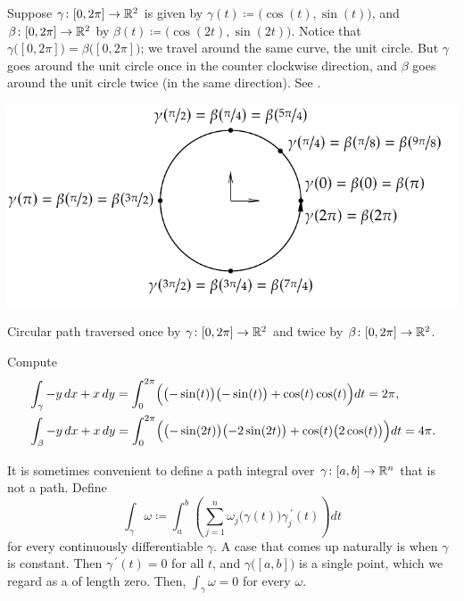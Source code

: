 \begin{example}
Suppose $\gamma \colon [0,2\pi] \to {\mathbb{R}}^2$ is given by $\gamma(t) \coloneqq
\bigl(\cos(t),\sin(t)\bigr)$, and
$\beta \colon [0,2\pi] \to {\mathbb{R}}^2$ by $\beta(t) \coloneqq
\bigl(\cos(2t),\sin(2t)\bigr)$.  Notice that
$\gamma\bigl([0,2\pi]\bigr) = \beta\bigl([0,2\pi]\bigr)$; we travel
around the same curve, the unit circle.  But $\gamma$ goes around the unit
circle once in the counter clockwise direction, and $\beta$ goes around the
unit circle twice (in the same direction). 
See .
\begin{myfigureht}
\includegraphics{figures/circlepathrepar2}
\caption{Circular path traversed once by
$\gamma \colon [0,2\pi] \to {\mathbb{R}}^2$
and twice by
$\beta \colon [0,2\pi] \to {\mathbb{R}}^2$.\label{fig:circlepathrepar2}}
\end{myfigureht}

Compute
\begin{align*}
& \int_{\gamma} -y\, dx + x\,dy
=
\int_0^{2\pi}
\Bigl( \bigl(-\sin(t) \bigr) \bigl(-\sin(t) \bigr) + \cos(t) \cos(t) \Bigr) dt
=
2 \pi,\\
& \int_{\beta} -y\, dx + x\,dy
=
\int_0^{2\pi}
\Bigl( \bigl(-\sin(2t) \bigr) \bigl(-2\sin(2t) \bigr) + \cos(t)
\bigl(2\cos(t)\bigr) \Bigr) dt
=
4 \pi.
\end{align*}
\end{example}

It is sometimes convenient to define a path integral over $\gamma \colon
[a,b] \to {\mathbb{R}}^n$ that is not a path.
Define
\begin{equation*}
\int_{\gamma} \omega \coloneqq \int_a^b
\left(
\sum_{j=1}^n
\omega_j\bigl(\gamma(t)\bigr) \gamma_j^{\:\prime}(t)
\right) dt 
\end{equation*}
for every continuously differentiable $\gamma$.  A 
case that comes up naturally is when $\gamma$ is constant.  Then
$\gamma^{\:\prime}(t) = 0$ for all $t$, and $\gamma\bigl([a,b]\bigr)$ is a single
point, which we regard as a  of length zero.  Then,
$\int_{\gamma} \omega = 0$ for every $\omega$.

